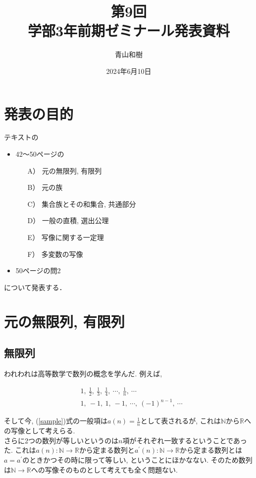 \documentclass[a4j]{jsarticle}
\title{第9回\\学部3年前期ゼミナール発表資料}
\author{青山和樹}
\date{2024年6月10日}
\begin{document}
\maketitle

\section*{発表の目的}
テキスト\cite{text}の
\begin{itemize}
	\item 42～50ページの
	      \begin{itemize}
		      \item[A）] 元の無限列, 有限列
		      \item[B）] 元の族
		      \item[C）] 集合族とその和集合, 共通部分
		      \item[D）] 一般の直積, 選出公理
		      \item[E）] 写像に関する一定理
		      \item[F）] 多変数の写像
	      \end{itemize}
	\item 50ページの問2
\end{itemize}
について発表する．

\tableofcontents

\clearpage

\section{元の無限列, 有限列}

\subsection{無限列}

われわれは高等数学で数列の概念を学んだ. 例えば,

\begin{align}
	\label{sample}
	 & 1,\:\frac{1}{2},\:\frac{1}{3},\:\frac{1}{4},\:\cdots,\:\frac{1}{n},\:\cdots \\
	 & 1,\:-1,\:1,\:-1,\:\cdots,\:(-1)^{n-1},\:\cdots
\end{align}

そして今, (\ref{sample})式の一般項は$a(n)=\frac{1}{n}$として表されるが, これは$\mathbb{N}$から$\mathbb{R}$への写像として考えらる. \\
さらに2つの数列が等しいというのは$n$項がそれぞれ一致するということであった. これは$a(n) : \mathbb{N} \rightarrow \mathbb{R}$から定まる数列と$a^{\prime}(n) : \mathbb{N} \rightarrow \mathbb{R}$から定まる数列とは$a=a^{\prime}$のときかつその時に限って等しい, ということにほかなない. そのため数列は$\mathbb{N} \rightarrow \mathbb{R}$への写像そのものとして考えても全く問題ない. \\
\end{document}
